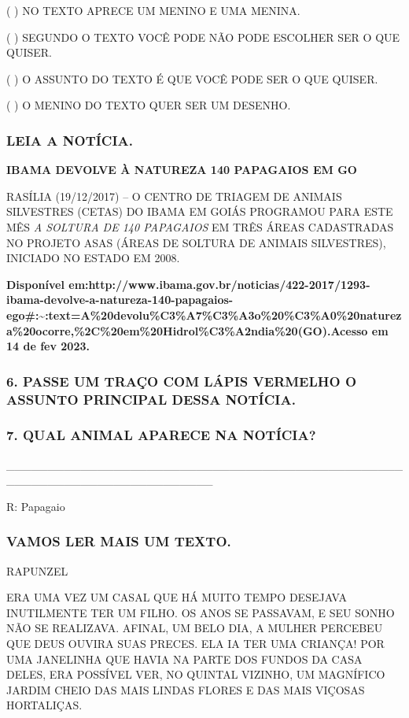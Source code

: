 ( ) NO TEXTO APRECE UM MENINO E UMA MENINA.

( ) SEGUNDO O TEXTO VOCÊ PODE NÃO PODE ESCOLHER SER O QUE QUISER.

( ) O ASSUNTO DO TEXTO É QUE VOCÊ PODE SER O QUE QUISER.

( ) O MENINO DO TEXTO QUER SER UM DESENHO.

\subsubsection{LEIA A NOTÍCIA.}\label{leia-a-notuxedcia.}

\textbf{IBAMA DEVOLVE À NATUREZA 140 PAPAGAIOS EM GO}

RASÍLIA (19/12/2017) -- O CENTRO DE TRIAGEM DE ANIMAIS SILVESTRES
(CETAS) DO IBAMA EM GOIÁS PROGRAMOU PARA ESTE MÊS \emph{A SOLTURA DE 140
PAPAGAIOS} EM TRÊS ÁREAS CADASTRADAS NO PROJETO ASAS (ÁREAS DE SOLTURA
DE ANIMAIS SILVESTRES), INICIADO NO ESTADO EM 2008.~

\textbf{Disponível
em:http://www.ibama.gov.br/noticias/422-2017/1293-ibama-devolve-a-natureza-140-papagaios-ego\#:\textasciitilde{}:text=A\%20devolu\%C3\%A7\%C3\%A3o\%20\%C3\%A0\%20natureza\%20ocorre,\%2C\%20em\%20Hidrol\%C3\%A2ndia\%20(GO).Acesso
em 14 de fev 2023.}

\subsubsection{6. PASSE UM TRAÇO COM LÁPIS VERMELHO O ASSUNTO PRINCIPAL
DESSA
NOTÍCIA.}\label{passe-um-trauxe7o-com-luxe1pis-vermelho-o-assunto-principal-dessa-notuxedcia.}

\subsubsection{7. QUAL ANIMAL APARECE NA
NOTÍCIA?}\label{qual-animal-aparece-na-notuxedcia}

\_\_\_\_\_\_\_\_\_\_\_\_\_\_\_\_\_\_\_\_\_\_\_\_\_\_\_\_\_\_\_\_\_\_\_\_\_\_\_\_\_\_\_\_\_\_\_\_\_\_\_\_\_\_\_\_\_\_\_\_\_\_\_\_\_\_\_\_\_\_\_\_\_

R: Papagaio

\subsubsection{VAMOS LER MAIS UM TEXTO.}\label{vamos-ler-mais-um-texto.}

RAPUNZEL

ERA UMA VEZ UM CASAL QUE HÁ MUITO TEMPO DESEJAVA INUTILMENTE TER UM
FILHO. OS ANOS SE PASSAVAM, E SEU SONHO NÃO SE REALIZAVA. AFINAL, UM
BELO DIA, A MULHER PERCEBEU QUE DEUS OUVIRA SUAS PRECES. ELA IA TER UMA
CRIANÇA! POR UMA JANELINHA QUE HAVIA NA PARTE DOS FUNDOS DA CASA DELES,
ERA POSSÍVEL VER, NO QUINTAL VIZINHO, UM MAGNÍFICO JARDIM CHEIO DAS MAIS
LINDAS FLORES E DAS MAIS VIÇOSAS HORTALIÇAS.

